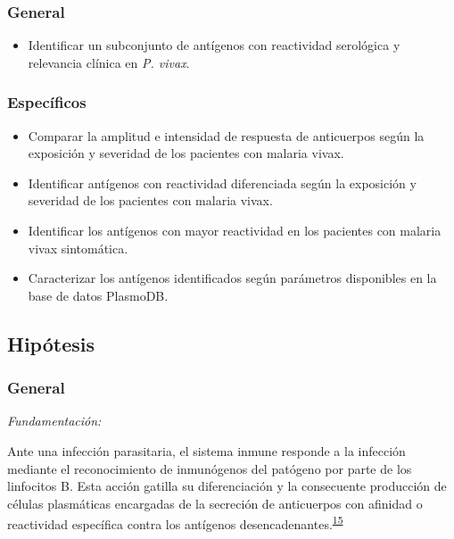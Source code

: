 \documentclass[]{article}
\providecommand{\tightlist}{%
  \setlength{\itemsep}{0pt}\setlength{\parskip}{0pt}}
\begin{document}
\subsubsection{General}\label{general}

\begin{itemize}
\tightlist
\item
  Identificar un subconjunto de antígenos con reactividad serológica y
  relevancia clínica en \emph{P. vivax}.
\end{itemize}

\subsubsection{Específicos}\label{especificos}

\begin{itemize}
\item
  Comparar la amplitud e intensidad de respuesta de anticuerpos según la
  exposición y severidad de los pacientes con malaria vivax.
\item
  Identificar antígenos con reactividad diferenciada según la exposición
  y severidad de los pacientes con malaria vivax.
\item
  Identificar los antígenos con mayor reactividad en los pacientes con
  malaria vivax sintomática.
\item
  Caracterizar los antígenos identificados según parámetros disponibles
  en la base de datos PlasmoDB.
\end{itemize}

\subsection{Hipótesis}\label{hipotesis}

\subsubsection{General}\label{general-1}

\emph{Fundamentación:}

Ante una infección parasitaria, el sistema inmune responde a la
infección mediante el reconocimiento de inmunógenos del patógeno por
parte de los linfocitos B. Esta acción gatilla su diferenciación y la
consecuente producción de células plasmáticas encargadas de la secreción
de anticuerpos con afinidad o reactividad específica contra los
antígenos
desencadenantes.\textsuperscript{\protect\hyperlink{ref-abbas2012}{15}}
\end{document}
